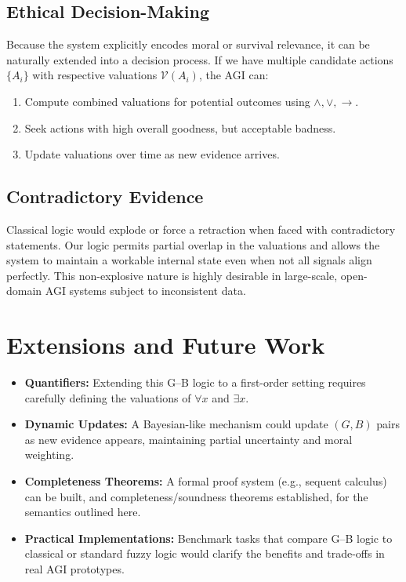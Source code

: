 \documentclass[11pt]{article}
\begin{document}
\subsection{Ethical Decision-Making}

Because the system explicitly encodes moral or survival relevance, it can be naturally extended 
into a decision process. If we have multiple candidate actions \(\{A_i\}\) with respective 
valuations \(\mathcal{V}(A_i)\), the AGI can:
\begin{enumerate}
  \item Compute combined valuations for potential outcomes using \(\land,\lor,\to\).
  \item Seek actions with high overall goodness, but acceptable badness.
  \item Update valuations over time as new evidence arrives.
\end{enumerate}

\subsection{Contradictory Evidence}

Classical logic would explode or force a retraction when faced with contradictory statements. 
Our logic permits partial overlap in the valuations and allows the system to maintain a workable 
internal state even when not all signals align perfectly. This non-explosive nature is highly 
desirable in large-scale, open-domain AGI systems subject to inconsistent data.

\section{Extensions and Future Work}

\begin{itemize}
    \item \textbf{Quantifiers:} Extending this G--B logic to a first-order setting 
    requires carefully defining the valuations of \(\forall x\) and \(\exists x\).
    \item \textbf{Dynamic Updates:} A Bayesian-like mechanism could update \((G,B)\) pairs 
    as new evidence appears, maintaining partial uncertainty and moral weighting.
    \item \textbf{Completeness Theorems:} A formal proof system (e.g., sequent calculus) 
    can be built, and completeness/soundness theorems established, for the semantics outlined here.
    \item \textbf{Practical Implementations:} Benchmark tasks that compare G--B logic 
    to classical or standard fuzzy logic would clarify the benefits and trade-offs 
    in real AGI prototypes.
\end{itemize}
\end{document}
